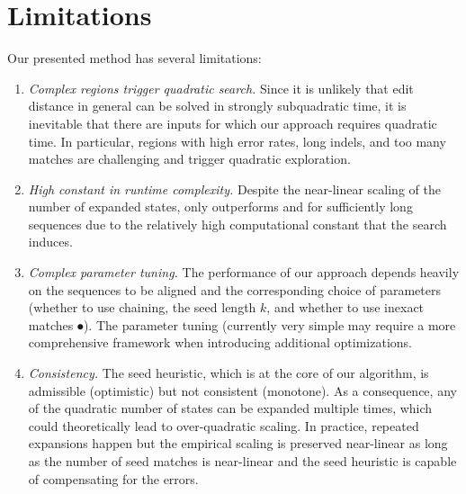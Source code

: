 \section*{Limitations}

Our presented method has several limitations:
\begin{enumerate}
  \item \emph{Complex regions trigger quadratic search.} Since it is unlikely
        that edit distance in general can be solved in strongly subquadratic
        time, it is inevitable that there are inputs for which our approach
        requires quadratic time. In particular, regions with high error rates,
        long indels, and too many matches are challenging and trigger quadratic
        exploration.
  \item \emph{High constant in runtime complexity.} Despite the near-linear
        scaling of the number of expanded states, \astarpa only outperforms
        \edlib and \wfa for sufficiently long sequences due to the relatively
        high computational constant that the \A search induces.
  \item \emph{Complex parameter tuning.} The performance of our approach depends
        heavily on the sequences to be aligned and the corresponding choice of
        parameters (whether to use chaining, the seed length $k$, and whether to
        use inexact matches $\spot$). The parameter tuning (currently very
        simple may require a more comprehensive framework when introducing
        additional optimizations.
  \item \emph{Consistency.} The seed heuristic, which is at the core of our \A
        algorithm, is admissible (optimistic) but not consistent (monotone). As
        a consequence, any of the quadratic number of states can be expanded
        multiple times, which could theoretically lead to over-quadratic
        scaling. In practice, repeated expansions happen but the empirical
        scaling is preserved near-linear as long as the number of seed matches
        is near-linear and the seed heuristic is capable of compensating for the
        errors.
\end{enumerate}

